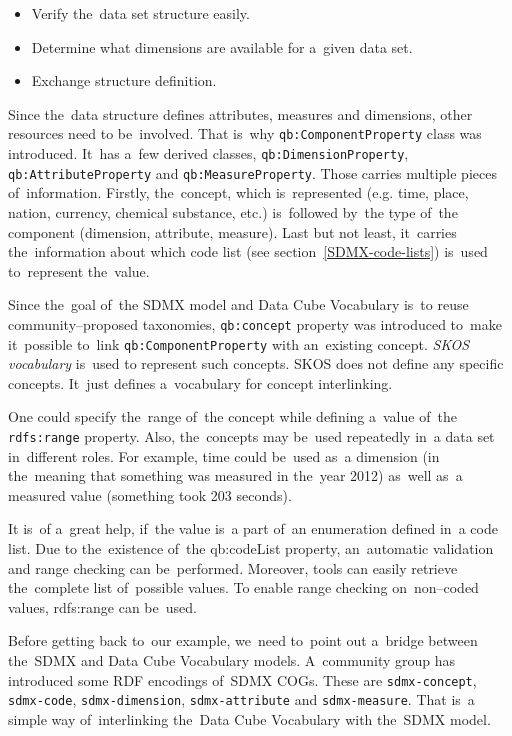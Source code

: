 \begin{itemize}
\item Verify the~data set structure easily.
\item Determine what dimensions are available for a~given data set.
\item Exchange structure definition.
\end{itemize}

\begin{sloppypar}
Since the~data structure defines attributes, measures and dimensions, other resources need
to be~involved. That is~why \texttt{qb:ComponentProperty} class was introduced. It~has a~few derived
classes, \texttt{qb:DimensionProperty}, \texttt{qb:AttributeProperty}
and \texttt{qb:MeasureProperty}. Those carries
multiple pieces of~information. Firstly, the~concept, which is~represented (e.g. time, place,
nation, currency, chemical substance, etc.) is~followed by~the type of~the component
(dimension, attribute, measure). Last but not least, it~carries the~information about which
code list (see section~\ref{SDMX-code-lists}) is~used to~represent the~value.
\end{sloppypar}

Since the~goal of~the SDMX model and Data Cube Vocabulary is~to reuse community--proposed
taxonomies, \texttt{qb:concept} property was introduced to~make it~possible to~link
\texttt{qb:ComponentProperty} with an~existing concept. \emph{SKOS vocabulary} is~used to
represent such concepts. SKOS does not define any specific concepts. It~just defines
a~vocabulary for concept interlinking.

One could specify the~range of~the concept while defining a~value of~the \texttt{rdfs:range} property.
Also, the~concepts may be~used repeatedly in~a data set in~different roles.
For example, time could be~used as~a dimension (in the~meaning that something was measured
in the~year 2012) as~well as~a measured value (something took 203 seconds).

It is~of a~great help, if~the value is~a part of~an enumeration defined in~a code list. Due to
the~existence of~the qb:codeList property, an~automatic validation and range checking
can be~performed. Moreover, tools can easily retrieve the~complete list of~possible values.
To enable range checking on~non--coded values, rdfs:range can be~used.

\begin{sloppypar}
Before getting back to~our example, we~need to~point out a~bridge between the~SDMX
and Data Cube Vocabulary models. A~community group has introduced some RDF 
encodings of~SDMX COGs. These are \texttt{sdmx-concept}, \texttt{sdmx-code}, \texttt{sdmx-dimension},
\texttt{sdmx-attribute} and \texttt{sdmx-measure}. That is~a simple way of~interlinking the~Data Cube
Vocabulary with the~SDMX model.
\end{sloppypar}


